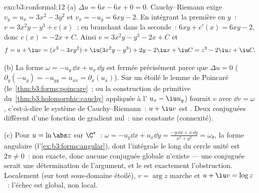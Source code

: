 \begin{solution}{exo:b3:conformal:12}
(a) $\Delta u = 6x - 6x + 0 = 0$. Cauchy--Riemann exige $v_y
= u_x = 3x^2 - 3y^2$ et $v_x = -u_y = 6xy - 2$. En intégrant
la première en $y$~: $v = 3x^2y - y^3 + c(x)$~; en
branchant dans la seconde~: $6xy + c'(x) = 6xy - 2$, donc
$c(x) = -2x + C$. Ainsi $v = 3x^2y - y^3 - 2x + C$ et
\[
f = u + \iu v = (x^3 - 3xy^2) + \iu(3x^2y - y^3)
+ 2y - 2\iu x + \iu C = z^3 - 2\iu z + \iu C .
\]

(b) La forme $\omega = -u_y\,\dd x + u_x\,\dd y$ est fermée
précisément parce que $\Delta u = 0$ ($\partial_y(-u_y) =
-u_{yy} = u_{xx} = \partial_x(u_x)$). Sur un  étoilé
le lemme de Poincaré (le~\cref{thm:b3:forms:poincare}~; ou
la construction de primitive
du~\cref{thm:b3:holomorphic:cauchy} appliquée à
l' $u_x - \iu u_y$) fournit $v$ avec $\dd v =
\omega$, c'est-à-dire le système de Cauchy--Riemann~: $u +
\iu v$ est . Deux conjuguées diffèrent d'une
fonction de gradient nul~: une constante (connexité).

(c) Pour $u = \ln\abs z$ sur $\C^*$~: $\omega = -u_y\dd x +
u_x\dd y = \frac{-y\,\dd x + x\,\dd y}{x^2 + y^2} =
\omega_\theta$, la forme angulaire
(l'\cref{ex:b3:forms:angular}), dont l'intégrale le long du
cercle unité est $2\pi \neq 0$~: non exacte, donc aucune
conjuguée globale n'existe --- une conjuguée serait une
détermination  de l'argument, et le 
est exactement l'obstruction. Localement (sur tout
sous-domaine étoilé), $v = \arg z$ marche et $u + \iu v =
\log z$~: l'échec est global, non local.
\end{solution}

